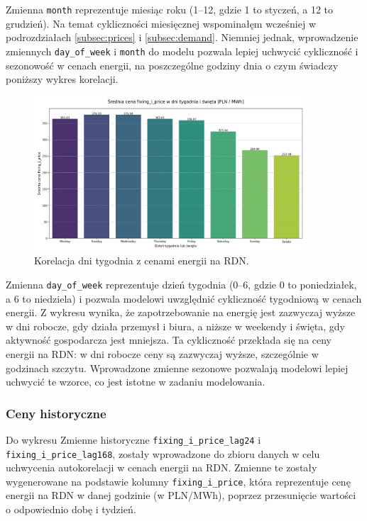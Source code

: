 Zmienna \texttt{month} reprezentuje miesiąc roku (1--12, gdzie 1 to styczeń, a 12 to grudzień). Na temat cykliczności miesięcznej wspominałęm wcześniej w podrozdziałach \ref{subsec:prices} i \ref{subsec:demand}. Niemniej jednak, wprowadzenie zmiennych \texttt{day\_of\_week} i \texttt{month} do modelu pozwala lepiej uchwycić cykliczność i sezonowość w cenach energii, na poszczególne godziny dnia o czym świadczy poniższy wykres korelacji.

\begin{figure}[H]
    \centering
    \includegraphics[width=0.9\textwidth]{../plots/fixing_i_price_weekdays_holidays.png}
    \caption{Korelacja dni tygodnia z cenami energii na RDN.}
    \label{fig:seasonal-correlation}
\end{figure}

Zmienna \texttt{day\_of\_week} reprezentuje dzień tygodnia (0--6, gdzie 0 to poniedziałek, a 6 to niedziela) i pozwala modelowi uwzględnić cykliczność tygodniową w cenach energii. Z wykresu wynika, że zapotrzebowanie na energię jest zazwyczaj wyższe w dni robocze, gdy działa przemysł i biura, a niższe w weekendy i święta, gdy aktywność gospodarcza jest mniejsza. Ta cykliczność przekłada się na ceny energii na RDN: w dni robocze ceny są zazwyczaj wyższe, szczególnie w godzinach szczytu. Wprowadzone zmienne sezonowe pozwalają modelowi lepiej uchwycić te wzorce, co jest istotne w zadaniu modelowania.

\subsubsection{Ceny historyczne}
\label{subsec:historical_prices}

Do wykresu 
Zmienne historyczne \texttt{fixing\_i\_price\_lag24} i \texttt{fixing\_i\_price\_lag168}, zostały wprowadzone do zbioru danych w celu uchwycenia autokorelacji w cenach energii na RDN. Zmienne te zostały wygenerowane na podstawie kolumny \texttt{fixing\_i\_price}, która reprezentuje cenę energii na RDN w danej godzinie (w PLN/MWh), poprzez przesunięcie wartości o odpowiednio dobę i tydzień.

